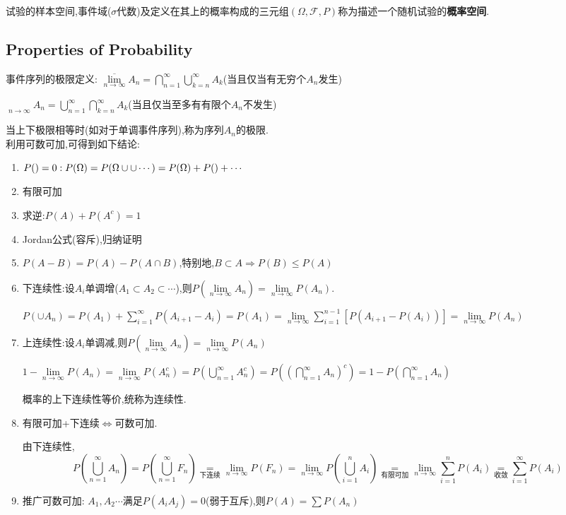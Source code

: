 试验的样本空间,事件域($ \sigma$代数)及定义在其上的概率构成的三元组$ (\Omega,
\mathcal{F}, P)$称为描述一个随机试验的{\bf 概率空间}.
\subsection{Properties of Probability}

事件序列的极限定义:
$ \overline {\lim \limits_{n \to \infty}}A_n  = \bigcap_{n
=1}^{\infty}\bigcup_{k=n}^{\infty}A_k $(当且仅当有无穷个$ A_n$发生)

$ \mathop{\underline \lim} \limits_{n \to \infty} A_n = \bigcup_{n
=1}^{\infty}\bigcap_{k=n}^{\infty}A_k$(当且仅当至多有有限个$ A_n$不发生)

当上下极限相等时(如对于单调事件序列),称为序列$ A_n$的极限.
\\

利用可数可加,可得到如下结论:
\begin{enumerate}
	\item $ P(\empty) = 0:
		P(\Omega) = P(\Omega \cup \empty \cup \empty \cdots) = P(\Omega) +
		P(\empty) + \cdots$
	\item 有限可加
	\item 求逆:$ P(A) + P(A^c) = 1$
	\item Jordan公式(容斥),归纳证明
	\item $ P(A - B) = P(A) - P(A\cap B)$,特别地,$ B \subset A \Rightarrow
		P(B) \le P(A)$
	\item 下连续性:设$ A_i$单调增($ A_1 \subset A_2 \subset \cdots$),则$
		P(\lim \limits_{n \to \infty }{A_n}) = \lim \limits_{n \to
		\infty}{P(A_n)}$.

		$ P(\cup A_n) = P(A_1) + \sum_{i = 1}^{\infty}{P(A_{i+1} - A_i)} =
		P(A_1) = \lim \limits_{n \to \infty}\sum_{i = 1}^{n-1}{[P(A_{i+1} -
		P(A_i))]} = \lim \limits_{n \to \infty}P(A_n)$

	\item 上连续性:设$ A_i$单调减,则$ P(\lim \limits_{n \to \infty} A_n ) =
		\lim \limits_{n \to \infty} P(A_n)$

		$ 1 - \lim \limits_{n \to \infty}P(A_n) = \lim \limits_{n \to
		\infty}P(A_n^c)=P(\bigcup_{n=1}^{\infty}A_n^c) =
		P((\bigcap_{n=1}^{\infty}A_n)^c) = 1-P(\bigcap_{n=1}^{\infty}A_n)$

		概率的上下连续性等价,统称为连续性.

	\item	有限可加+下连续$ \Leftrightarrow $可数可加.

		由下连续性,\[  P(\bigcup_{n=1}^{\infty}A_n) =
		P(\bigcup_{n=1}^{\infty}F_n) \mathop{=}\limits_{\texttt{下连续}}\lim\limits_{n \to \infty}P(F_n)=
		\lim\limits_{n\to\infty}P(\bigcup_{i=1}^nA_i)
		\mathop{=}\limits_{\texttt{有限可加}}
		\lim\limits_{n\to\infty}\sum_{i=1}^n{P(A_i)}\mathop{=} \limits_{\texttt{收敛}}
	\sum_{i=1}^{\infty}P(A_i)\]

\item 推广可数可加:
	$ A_1,A_2\cdots $满足$ P(A_iA_j)=0$(弱于互斥),则$ P(A) = \sum{P(A_n)}$
\end{enumerate}

